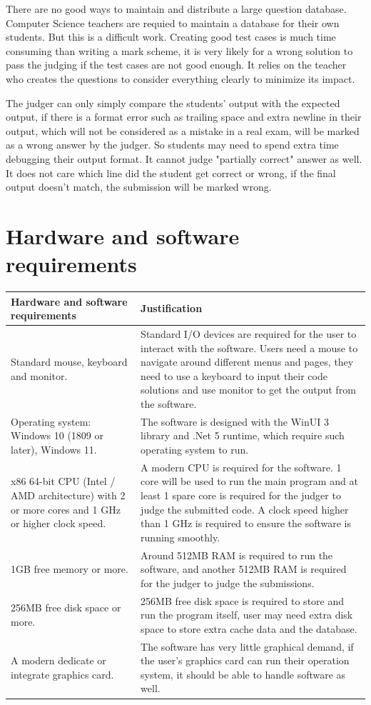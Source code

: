 \documentclass[a4paper]{report}
\begin{document}
There are no good ways to maintain and distribute a large question database. Computer Science teachers are requied to maintain a database for their own students. But this is a difficult work. Creating good test cases is much time consuming than writing a mark scheme, it is very likely for a wrong solution to pass the judging if the test cases are not good enough. It relies on the teacher who creates the questions to consider everything clearly to minimize its impact.

The judger can only simply compare the students' output with the expected output, if there is a format error such as trailing space and extra newline in their output, which will not be considered as a mistake in a real exam, will be marked as a wrong answer by the judger. So students may need to spend extra time debugging their output format. It cannot judge "partially correct" answer as well. It does not care which line did the student get correct or wrong, if the final output doesn't match, the submission will be marked wrong. 

\section{Hardware and software requirements}

\begin{tabulary}{\linewidth}{|L|L|}
    \hline
    Hardware and software requirements & Justification \\
    \hline
    Standard mouse, keyboard and monitor. & Standard I/O devices are required for the user to interact with the software. Users need a mouse to navigate around different menus and pages, they need to use a keyboard to input their code solutions and use monitor to get the output from the software. \\
    \hline
    Operating system: Windows 10 (1809 or later), Windows 11. & The software is designed with the WinUI 3 library and .Net 5 runtime, which require such operating system to run. \\
    \hline
    x86 64-bit CPU (Intel / AMD architecture) with 2 or more cores and 1 GHz or higher clock speed. & A modern CPU is required for the software. 1 core will be used to run the main program and at least 1 spare core is required for the judger to judge the submitted code. A clock speed higher than 1 GHz is required to ensure the software is running smoothly. \\
    \hline
    1GB free memory or more. & Around 512MB RAM is required to run the software, and another 512MB RAM is required for the judger to judge the submissions. \\
    \hline
    256MB free disk space or more. & 256MB free disk space is required to store and run the program itself, user may need extra disk space to store extra cache data and the database. \\
    \hline
    A modern dedicate or integrate graphics card. & The software has very little graphical demand, if the user's graphics card can run their operation system, it should be able to handle software as well. \\
    \hline
\end{tabulary}
\end{document}
